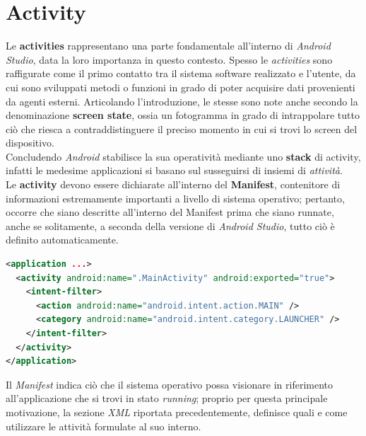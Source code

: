 \documentclass{article}
\begin{document}
\pagestyle{empty}

\section*{Activity}
\large

Le \textbf{activities} rappresentano una parte fondamentale all'interno di \textit{Android Studio}, data la loro importanza in questo contesto. Spesso le \textit{activities} sono raffigurate come il primo contatto tra il sistema software realizzato e l'utente, da cui sono sviluppati metodi o funzioni in grado di poter acquisire dati provenienti da agenti esterni. Articolando l'introduzione, le stesse sono note anche secondo la denominazione \textbf{screen state}, ossia un fotogramma in grado di intrappolare tutto ciò che riesca a contraddistinguere il preciso momento in cui si trovi lo screen del dispositivo. \vspace*{14pt}\\
Concludendo \textit{Android} stabilisce la sua operatività mediante uno \textbf{stack} di activity, infatti le medesime applicazioni si basano sul susseguirsi di insiemi di \textit{attività}.\vspace*{14pt}\\
Le \textbf{activity} devono essere dichiarate all'interno del \textbf{Manifest}, contenitore di informazioni estremamente importanti a livello di sistema operativo; pertanto, occorre che siano descritte all'interno del Manifest prima che siano runnate, anche se solitamente, a seconda della versione di \textit{Android Studio}, tutto ciò è definito automaticamente.
\begin{lstlisting}[language=XML, title=Dichiarazione di un'activity all'interno del Manifest]
<application ...>
  <activity android:name=".MainActivity" android:exported="true">
    <intent-filter>
      <action android:name="android.intent.action.MAIN" />
      <category android:name="android.intent.category.LAUNCHER" />
    </intent-filter>
  </activity>
</application>
\end{lstlisting}
Il \textit{Manifest} indica ciò che il sistema operativo possa visionare in riferimento all'applicazione che si trovi in stato \textit{running}; proprio per questa principale motivazione, la sezione \textit{XML} riportata precedentemente, definisce quali e come utilizzare le attività formulate al suo interno.
\end{document}
